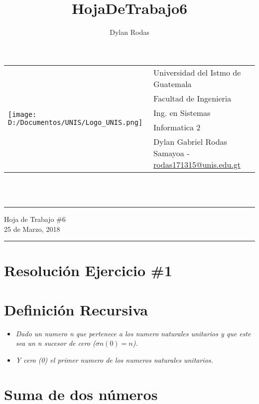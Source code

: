 \documentclass[10pt,a4paper]{article}
\author{Dylan Rodas}
\title{HojaDeTrabajo6}
\newcommand{\horrule}[1]{\rule{\linewidth}{#1}}
\begin{document}
    
        \begin{tabular}{l l}
         \multirow{5}{*}{\texttt{[image: D:/Documentos/UNIS/Logo\_UNIS.png]}} & Universidad del Istmo de Guatemala \\
         & Facultad de Ingenieria \\
         & Ing. en Sistemas \\
         & Informatica 2 \\
         & Dylan Gabriel Rodas Samayoa - \href{mailto:rodas171315@unis.edu.gt}{rodas171315@unis.edu.gt} \\
        \end{tabular}
        \\\    
        
        \begin{center}
            \horrule{0.5pt}
            \huge{Hoja de Trabajo \#6} \\
            \large{25 de Marzo, 2018} \\
            \horrule{1pt}
        \end{center}
    
        \begin{center}
        \section*{Resoluci\'on Ejercicio \#1}
        \section*{Definici\'on Recursiva}
        \end{center}

        \begin{itemize}
            \item\textit{Dado un numero n que pertenece a los numero naturales unitarios y que este sea un n sucesor de cero ($\sigma n(0) = n$).}
            \item\textit{Y cero (0) el primer numero de los numeros naturales unitarios.}
        \end{itemize}
    
        \section*{Suma de dos n\'umeros}
        
\end{document}
